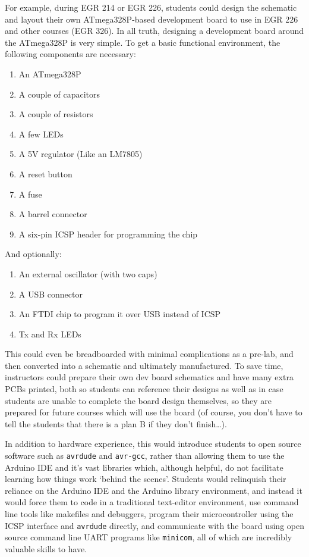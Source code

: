 \documentclass[12pt]{article}
\numberwithin{figure}{section}
\numberwithin{equation}{section}
\begin{document}
{\bigskip

For example, during EGR 214 or EGR 226, students could design the
schematic and layout their own ATmega328P-based development board to use
in EGR 226 and other courses (EGR 326). In all truth, designing a
development board around the ATmega328P is very simple. To get a basic
functional environment, the following components are necessary:

\begin{enumerate}
\itemsep1pt\parskip0pt
\item An ATmega328P
\item A couple of capacitors
\item A couple of resistors
\item A few LEDs
\item A 5V regulator (Like an LM7805)
\item A reset button
\item A fuse
\item A barrel connector
\item A six-pin ICSP header for programming the chip
\end{enumerate}

And optionally:

\begin{enumerate}
\itemsep1pt\parskip0pt
\item An external oscillator (with two caps)
\item A USB connector
\item An FTDI chip to program it over USB instead of ICSP
\item Tx and Rx LEDs
\end{enumerate}

This could even be breadboarded with minimal complications as a pre-lab,
and then converted into a schematic and ultimately manufactured. To save
time, instructors could prepare their own dev board schematics and have
many extra PCBs printed, both so students can reference their designs as
well as in case students are unable to complete the board design
themselves, so they are prepared for future courses which will use the
board (of course, you don't have to tell the students that there is a
plan B if they don't finish\ldots{}).

\bigskip

In addition to hardware experience, this would introduce students to
open source software such as \texttt{avrdude} and \texttt{avr-gcc},
rather than allowing them to use the Arduino IDE and it's vast libraries
which, although helpful, do not facilitate learning how things work
`behind the scenes'. Students would relinquish their reliance on the
Arduino IDE and the Arduino library environment, and instead it would
force them to code in a traditional text-editor environment, use command
line tools like makefiles and debuggers, program their microcontroller
using the ICSP interface and \texttt{avrdude} directly, and communicate
with the board using open source command line UART programs like
\texttt{minicom}, all of which are incredibly valuable skills to have.

}
\end{document}
